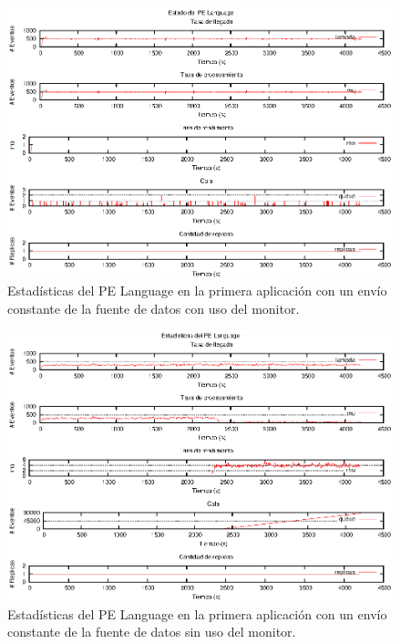 \begin{figure}[p]
\centering
    \includegraphics[scale=1.1]{images/exp/app1/uniform/cm/statusLanguagePE.eps}
    \caption{Estadísticas del PE Language en la primera aplicación con un envío constante de la fuente de datos con uso del monitor.}
    \label{fig:app1-uniform-statusLanguagePE-cm}
\end{figure}

\begin{figure}[p]
\centering
    \includegraphics[scale=1.1]{images/exp/app1/uniform/sm/statusLanguagePE.eps}
    \caption{Estadísticas del PE Language en la primera aplicación con un envío constante de la fuente de datos sin uso del monitor.}
    \label{fig:app1-uniform-statusLanguagePE-sm}
\end{figure}

